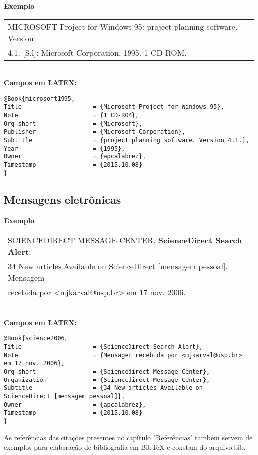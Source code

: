 \textbf{Exemplo} \\

\begin{tabular}{|l|c|} \hline
MICROSOFT Project for Windows 95: project planning software. Version \\4.1. [S.l]: Microsoft Corporation, 1995. 1 CD-ROM. 
	\\\hline
\end{tabular} \\

\textbf{Campos em LATEX:} 

\begin{verbatim}
@Book{microsoft1995,
Title                    = {Microsoft Project for Windows 95},
Note                     = {1 CD-ROM},
Org-short                = {Microsoft},
Publisher                = {Microsoft Corporation},
Subtitle                 = {project planning software. Version 4.1.},
Year                     = {1995},
Owner                    = {apcalabrez},
Timestamp                = {2015.10.08}
}
\end{verbatim}

\subsection{Mensagens eletrônicas}

\textbf{Exemplo} \\

\begin{tabular}{|l|c|} \hline
SCIENCEDIRECT MESSAGE CENTER. \textbf{ScienceDirect Search Alert}: \\34 New articles Available on ScienceDirect [mensagem pessoal]. Mensagem \\recebida por <mjkarval@usp.br> em 17 nov. 2006. 
	\\\hline
\end{tabular} \\

\textbf{Campos em LATEX:} 

\begin{verbatim}
@Book{science2006,
Title                    = {ScienceDirect Search Alert},
Note                     = {Mensagem recebida por <mjkarval@usp.br> 
em 17 nov. 2006},
Org-short                = {Sciencedirect Message Center},
Organization             = {Sciencedirect Message Center},
Subtitle                 = {34 New articles Available on 
ScienceDirect [mensagem pessoal]},
Owner                    = {apcalabrez},
Timestamp                = {2015.10.08}
}
\end{verbatim}

As referências das citações presentes no capítulo "Referências"  também servem de exemplos para elaboração de bibliografia em BibTeX e constam do arquivo.bib. 

